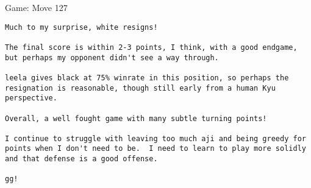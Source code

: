 \documentclass{article}
\begin{document}
\begin{section}{Game: Move 127}
\begin{center}
\begin{lstlisting}
Much to my surprise, white resigns!

The final score is within 2-3 points, I think, with a good endgame, but perhaps my opponent didn't see a way through. 

leela gives black at 75% winrate in this position, so perhaps the resignation is reasonable, though still early from a human Kyu perspective. 

Overall, a well fought game with many subtle turning points!  

I continue to struggle with leaving too much aji and being greedy for points when I don't need to be.  I need to learn to play more solidly and that defense is a good offense. 

gg!
\end{lstlisting}
\end{center}
\end{section}
\end{document}
